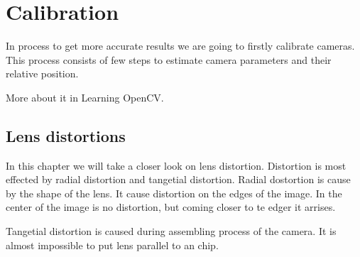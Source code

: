 \chapter{Calibration}

In process to get more accurate results we are going to firstly calibrate cameras. This process consists of few steps to estimate camera parameters and their relative position.

More about it in Learning OpenCV.

\section{Lens distortions}

In this chapter we will take a closer look on lens distortion. Distortion is most effected by radial distortion and tangetial distortion. Radial dostortion is cause by the shape of the lens. It cause distortion on the edges of the image. In the center of the image is no distortion, but coming closer to te edger it arrises.

Tangetial distortion is caused during assembling process of the camera. It is almost impossible to put lens parallel to an chip.


